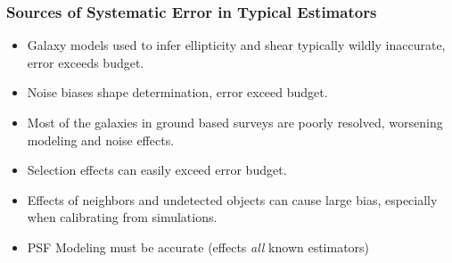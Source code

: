 \documentclass{beamer}
\begin{document}
\frame
{
    \frametitle{Sources of Systematic Error in Typical Estimators}

 
    \begin{itemize}

        \item Galaxy models used to infer ellipticity and shear 
            typically wildly inaccurate, error exceeds budget.

        \item Noise biases shape determination, error exceed budget.

        \item Most of the galaxies in ground based surveys are
            poorly resolved, worsening modeling and noise effects.

        \item Selection effects can easily exceed error budget.

        \item Effects of neighbors and undetected objects can cause
            large bias, especially when calibrating from simulations.

        \item PSF Modeling must be accurate (effects {\em all} known estimators)

    \end{itemize}

}
\end{document}
